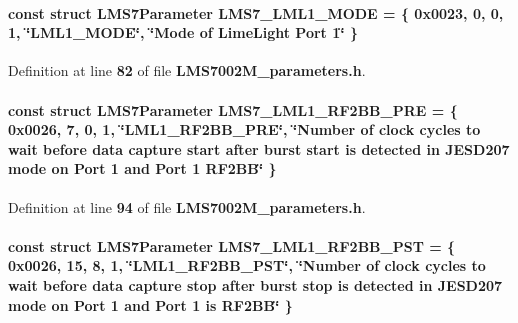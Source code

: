 \paragraph[{L\+M\+S7\+\_\+\+L\+M\+L1\+\_\+\+M\+O\+DE}]{\setlength{\rightskip}{0pt plus 5cm}const struct {\bf L\+M\+S7\+Parameter} L\+M\+S7\+\_\+\+L\+M\+L1\+\_\+\+M\+O\+DE = \{ 0x0023, 0, 0, 1, \char`\"{}\+L\+M\+L1\+\_\+\+M\+O\+D\+E\char`\"{}, \char`\"{}\+Mode of Lime\+Light Port 1\char`\"{} \}\hspace{0.3cm}{\ttfamily [static]}}\label{LMS7002M__parameters_8h_a287d90542cefac8fb640b5e3745e8be2}


Definition at line {\bf 82} of file {\bf L\+M\+S7002\+M\+\_\+parameters.\+h}.

\paragraph[{L\+M\+S7\+\_\+\+L\+M\+L1\+\_\+\+R\+F2\+B\+B\+\_\+\+P\+RE}]{\setlength{\rightskip}{0pt plus 5cm}const struct {\bf L\+M\+S7\+Parameter} L\+M\+S7\+\_\+\+L\+M\+L1\+\_\+\+R\+F2\+B\+B\+\_\+\+P\+RE = \{ 0x0026, 7, 0, 1, \char`\"{}\+L\+M\+L1\+\_\+\+R\+F2\+B\+B\+\_\+\+P\+R\+E\char`\"{}, \char`\"{}\+Number of clock cycles to wait before data capture start after burst start is detected in J\+E\+S\+D207 mode on Port 1 and Port 1 R\+F2\+B\+B\char`\"{} \}\hspace{0.3cm}{\ttfamily [static]}}\label{LMS7002M__parameters_8h_ad072e2fa66b7a101621e5d3e0eb4be29}


Definition at line {\bf 94} of file {\bf L\+M\+S7002\+M\+\_\+parameters.\+h}.

\paragraph[{L\+M\+S7\+\_\+\+L\+M\+L1\+\_\+\+R\+F2\+B\+B\+\_\+\+P\+ST}]{\setlength{\rightskip}{0pt plus 5cm}const struct {\bf L\+M\+S7\+Parameter} L\+M\+S7\+\_\+\+L\+M\+L1\+\_\+\+R\+F2\+B\+B\+\_\+\+P\+ST = \{ 0x0026, 15, 8, 1, \char`\"{}\+L\+M\+L1\+\_\+\+R\+F2\+B\+B\+\_\+\+P\+S\+T\char`\"{}, \char`\"{}\+Number of clock cycles to wait before data capture stop after burst stop is detected in J\+E\+S\+D207 mode on Port 1 and Port 1 is R\+F2\+B\+B\char`\"{} \}\hspace{0.3cm}{\ttfamily [static]}}\label{LMS7002M__parameters_8h_aefb3f50afa91348d53e4231914f7bddb}


